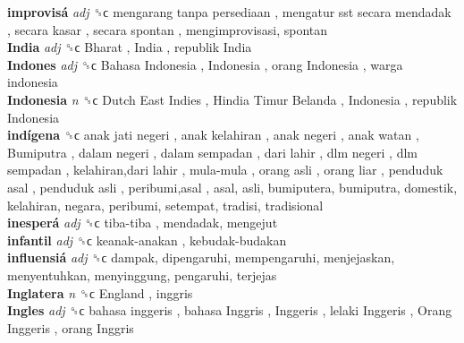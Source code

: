 \textbf{improvisá} \emph{adj}  ␝ϲ   mengarang tanpa persediaan ,  mengatur sst secara mendadak ,  secara kasar ,  secara spontan , mengimprovisasi, spontan  \\
\textbf{India} \emph{adj}  ␝ϲ   Bharat ,  India ,  republik India   \\
\textbf{Indones} \emph{adj}  ␝ϲ   Bahasa Indonesia ,  Indonesia ,  orang Indonesia ,  warga indonesia   \\
\textbf{Indonesia} \emph{n}  ␝ϲ   Dutch East Indies ,  Hindia Timur Belanda ,  Indonesia ,  republik Indonesia   \\
\textbf{indígena} ␝ϲ   anak jati negeri ,  anak kelahiran ,  anak negeri ,  anak watan ,  Bumiputra ,  dalam negeri ,  dalam sempadan ,  dari lahir ,  dlm negeri ,  dlm sempadan ,  kelahiran,dari lahir ,  mula-mula ,  orang asli ,  orang liar ,  penduduk asal ,  penduduk asli ,  peribumi,asal , asal, asli, bumiputera, bumiputra, domestik, kelahiran, negara, peribumi, setempat, tradisi, tradisional  \\
\textbf{inesperá} \emph{adj}  ␝ϲ   tiba-tiba , mendadak, mengejut  \\
\textbf{infantil} \emph{adj}  ␝ϲ   keanak-anakan ,  kebudak-budakan   \\
\textbf{influensiá} \emph{adj}  ␝ϲ  dampak, dipengaruhi, mempengaruhi, menjejaskan, menyentuhkan, menyinggung, pengaruhi, terjejas  \\
\textbf{Inglatera} \emph{n}  ␝ϲ   England , inggris  \\
\textbf{Ingles} \emph{adj}  ␝ϲ   bahasa inggeris ,  bahasa Inggris ,  Inggeris ,  lelaki Inggeris ,  Orang Inggeris ,  orang Inggris   \\
